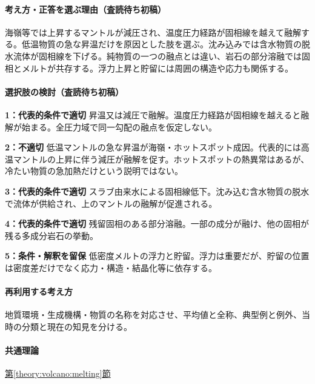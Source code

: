 \paragraph{考え方・正答を選ぶ理由（査読待ち初稿）} 海嶺等では上昇するマントルが減圧され、温度圧力経路が固相線を越えて融解する。低温物質の急な昇温だけを原因とした肢を選ぶ。沈み込みでは含水物質の脱水流体が固相線を下げる。純物質の一つの融点とは違い、岩石の部分溶融では固相とメルトが共存する。浮力上昇と貯留には周囲の構造や応力も関係する。

\paragraph{選択肢の検討（査読待ち初稿）}\mbox{}\par

\noindent\textbf{1：代表的条件で適切} 昇温又は減圧で融解。温度圧力経路が固相線を越えると融解が始まる。全圧力域で同一勾配の融点を仮定しない。\par

\noindent\textbf{2：不適切} 低温マントルの急な昇温が海嶺・ホットスポット成因。代表的には高温マントルの上昇に伴う減圧が融解を促す。ホットスポットの熱異常はあるが、冷たい物質の急加熱だけという説明ではない。\par

\noindent\textbf{3：代表的条件で適切} スラブ由来水による固相線低下。沈み込む含水物質の脱水で流体が供給され、上のマントルの融解が促進される。\par

\noindent\textbf{4：代表的条件で適切} 残留固相のある部分溶融。一部の成分が融け、他の固相が残る多成分岩石の挙動。\par

\noindent\textbf{5：条件・解釈を留保} 低密度メルトの浮力と貯留。浮力は重要だが、貯留の位置は密度差だけでなく応力・構造・結晶化等に依存する。\par

\paragraph{再利用する考え方} 地質環境・生成機構・物質の名称を対応させ、平均値と全称、典型例と例外、当時の分類と現在の知見を分ける。

\paragraph{共通理論} \hyperref[theory:volcano:melting]{第\ref*{theory:volcano:melting}節}

